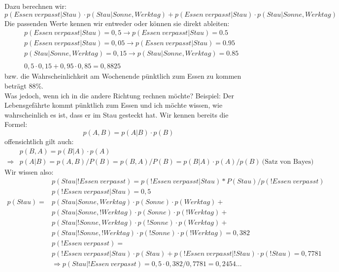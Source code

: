 Dazu berechnen wir:\\
\begin{equation*}
p(\!Essen ~verpasst | Stau) \cdot p(Stau | Sonne, \!Werktag) + p(\!Essen ~verpasst | \!Stau)
\cdot p(\!Stau | Sonne, \!Werktag)
\end{equation*}
%
Die passenden Werte kennen wir entweder oder können sie direkt ableiten:
\begin{align*}
&p(Essen ~verpasst | Stau) = 0,5 \rightarrow p(\!Essen ~verpasst | Stau) = 0.5\\
&p(Essen ~verpasst | \!Stau) = 0,05 \rightarrow p(\!Essen ~verpasst | \!Stau) = 0.95\\
&p(Stau | Sonne, \!Werktag) = 0,15 \rightarrow p(\!Stau | Sonne, \!Werktag) = 0.85\\\\
&0,5 \cdot 0,15 + 0,95 \cdot 0,85 = 0,8825 
\end{align*}
%
bzw. die Wahrscheinlichkeit am Wochenende pünktlich zum Essen zu kommen beträgt 88\%.\\
Was jedoch, wenn ich in die andere Richtung rechnen möchte?
Beispiel: Der Lebensgefährte kommt pünktlich zum Essen und ich möchte wissen, wie wahrscheinlich es ist, dass er im Stau gesteckt hat.
%
Wir kennen bereits die Formel:
\begin{equation*}
p(A,B) = p (A | B) \cdot p(B)
\end{equation*}
offensichtlich gilt auch:
\begin{align*}
&p(B,A) = p (B | A) \cdot p(A) \\
\Rightarrow & p(A | B) = p(A,B) / P(B) = p(B,A) / P(B) = p(B | A) \cdot p(A)/p(B) ~\text{(Satz von Bayes)}
\end{align*}
%
Wir wissen also:
\begin{align*}
&p(Stau | !Essen ~verpasst) = p(!Essen ~verpasst | Stau ) *P(Stau)/p(! Essen ~verpasst)\\
&p(!Essen ~verpasst | Stau) =0,5\\
p(Stau) =&p(Stau | Sonne, Werktag) \cdot p(Sonne) \cdot p(Werktag) + \\
&p(Stau | Sonne, !Werktag) \cdot p(Sonne) \cdot p(!Werktag)+ \\
&p(Stau | !Sonne, Werktag) \cdot p(!Sonne) \cdot p(Werktag) + \\
&p(Stau | !Sonne, !Werktag) \cdot p(!Sonne) \cdot p(!Werktag)= 0,382\\
&p(!Essen ~verpasst) =\\
&p(!Essen ~verpasst | Stau) \cdot p(Stau) + p(!Essen ~verpasst | !Stau) \cdot p(!Stau) = 0,7781 \\
&\Rightarrow p(Stau | !Essen ~verpasst)=0,5 \cdot 0,382/0,7781 = 0,2454...
\end{align*}
